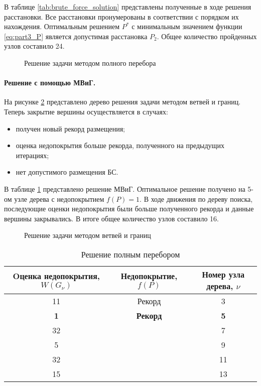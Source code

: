 В таблице \cref{tab:brute_force_solution} представлены полученные в ходе решения расстановки. Все расстановки пронумерованы в соответствии с порядком их нахождения. Оптимальным решением $P^*$ с минимальным значением функции \cref{eq:part3_P} является допустимая расстановка $P_2$. Общее количество пройденных узлов составило 24.


\begin{figure}[ht]
  \caption{Решение задачи методом полного перебора}\label{fig:part2_brute_force_tree}
\end{figure}

\paragraph{Решение с помощью МВиГ.}

 На рисунке \cref{fig:part2_branch_and_bound_tree} представлено дерево решения задачи методом ветвей и границ. Теперь закрытие вершины осуществляется в случаях:
 \begin{itemize}
   \item получен новый рекорд размещения;
   \item оценка недопокрытия больше рекорда, полученного на предыдущих итерациях;
   \item нет допустимого размещения БС.
\end{itemize} 


В таблице \cref{tab:branch_and_bound_solution} представлено решение МВиГ. Оптимальное решение получено на 5-ом узле дерева с недопокрытием $f(P)=1$. В ходе движения по дереву поиска, последующие оценки недопокрытия были больше полученного рекорда и данные вершины закрывались. В итоге общее количество узлов составило 16.


\begin{figure}[ht]
  \caption{Решение задачи методом ветвей и границ}\label{fig:part2_branch_and_bound_tree}
\end{figure}

\begin{table}[h!]\centering
  \begin{tabular}{|c|c|c|}\hline
      
      Oценка недопокрытия, $W(G_\nu)$ & Недопокрытие, $f(P)$ & Номер узла дерева, $\nu$\\
      \hline
      11 & Рекорд & 3\\
      \textbf{1} & \textbf{Рекорд} & \textbf{5}\\
      32 &  & 7\\
      5 &  & 9\\
      32 &  & 11\\
      15 &  & 13\\
      \hline

\end{tabular}\caption{Решение полным перебором}\label{tab:branch_and_bound_solution}
\end{table}


